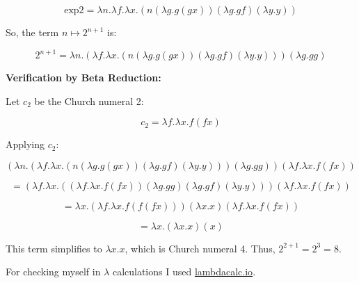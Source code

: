 \documentclass{article}
\begin{document}
\begin{enumerate}
\begin{enumerate}
        \[
        \text{exp2} = \lambda n. \lambda f. \lambda x. (n (\lambda g. g (g x)) (\lambda g. g f) (\lambda y. y))
        \]
        
        So, the term \( n \mapsto 2^{n+1} \) is:
        
\[
2^{n+1} = \lambda n. (\lambda f. \lambda x. (n (\lambda g. g (g x)) (\lambda g. g f) (\lambda y. y))) (\lambda g. g g)
\]


        \textbf{Verification by Beta Reduction:}
        
        Let \( c_2 \) be the Church numeral 2:
        
        \[
        c_2 = \lambda f. \lambda x. f (f x)
        \]
        
        Applying \( c_2 \):
        
        \[
        (\lambda n. (\lambda f. \lambda x. (n (\lambda g. g (g x)) (\lambda g. g f) (\lambda y. y))) (\lambda g. g g)) (\lambda f. \lambda x. f (f x))
        \]
        
        \[
        = (\lambda f. \lambda x. ((\lambda f. \lambda x. f (f x)) (\lambda g. g g) (\lambda g. g f) (\lambda y. y))) (\lambda f. \lambda x. f (f x))
        \]
        
        \[
        = \lambda x. (\lambda f. \lambda x. f (f (f x))) (\lambda x. x) (\lambda f. \lambda x. f (f x))
        \]
        
        \[
        = \lambda x. (\lambda x. x) (x)
        \]
        
        This term simplifies to \( \lambda x. x \), which is Church numeral 4. Thus, \( 2^{2+1} = 2^3 = 8 \).
        
    \end{enumerate}
\end{enumerate}

For checking myself in $\lambda$ calculations I used \href{https://lambdacalc.io/}{lambdacalc.io}.
\end{document}
